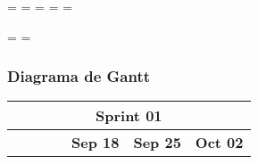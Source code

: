 \newpage
\paperwidth=\pdfpageheight
\paperheight=\pdfpagewidth
\pdfpageheight=\paperheight
\pdfpagewidth=\paperwidth
\headwidth=\textheight

\begingroup
    \vsize=\textwidth
    \hsize=\textheight
    \subsubsection{Diagrama de Gantt}
    \label{sec:gantt}
    \begin{table}[h]
        \centering
        \begin{tabular}{|llcllllllllllllllll|}
        \hline
        \multicolumn{19}{|c|}{\cellcolor[HTML]{8EA9D8}\textbf{Sprint 01}}                                                                                                                                                                                                                                                                                                                                                                                                                                                                                                                                                                                                                                                                                                                                                                                                                            \\ \hline
        \multicolumn{1}{|c|}{\cellcolor[HTML]{FFFFFF}}                                                             & \multicolumn{1}{c|}{\cellcolor[HTML]{FFFFFF}}                                  & \multicolumn{1}{c|}{\cellcolor[HTML]{FFFFFF}}                                    & \multicolumn{1}{c|}{\cellcolor[HTML]{FFFFFF}}                                        & \multicolumn{5}{c|}{\cellcolor[HTML]{FFFFFF}\textbf{Sep 18}}                                                                                                            & \multicolumn{5}{c|}{\cellcolor[HTML]{FFFFFF}\textbf{Sep 25}}                                                                                                            & \multicolumn{5}{c|}{\cellcolor[HTML]{FFFFFF}\textbf{Oct 02}}                                                                                                     \\ \cline{5-19} 

\end{tabular}
\end{table}
